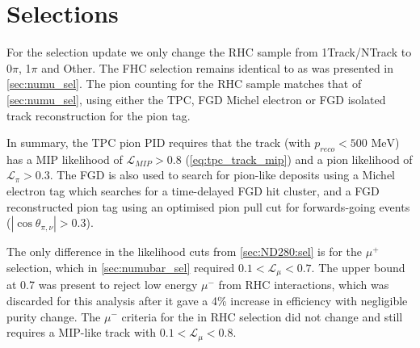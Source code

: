 \section{Selections}
For the selection update we only change the RHC sample from 1Track/NTrack to 0$\pi$, 1$\pi$ and Other. The FHC selection remains identical to as was presented in \autoref{sec:numu_sel}. The pion counting for the RHC sample matches that of \autoref{sec:numu_sel}, using either the TPC, FGD Michel electron or FGD isolated track reconstruction for the pion tag. 

In summary, the TPC pion PID requires that the track (with $p_{reco}<500\text{ MeV}$) has a MIP likelihood of $\mathcal{L}_{MIP} > 0.8$ (\autoref{eq:tpc_track_mip}) and a pion likelihood of $\mathcal{L}_\pi > 0.3$. The FGD is also used to search for pion-like deposits using a Michel electron tag which searches for a time-delayed FGD hit cluster, and a FGD reconstructed pion tag using an optimised pion pull cut for forwards-going events ($|\cos\theta_{\pi,\nu}|>0.3$).

The only difference in the likelihood cuts from \autoref{sec:ND280:sel} is for the $\mu^+$ selection, which in \autoref{sec:numubar_sel} required $0.1 < \mathcal{L}_\mu < 0.7$. The upper bound at 0.7 was present to reject low energy $\mu^-$ from \numu RHC interactions, which was discarded for this analysis after it gave a 4\% increase in efficiency with negligible purity change. The $\mu^-$ criteria for the \numu in RHC selection did not change and still requires a MIP-like track with $0.1 < \mathcal{L}_\mu < 0.8$.

